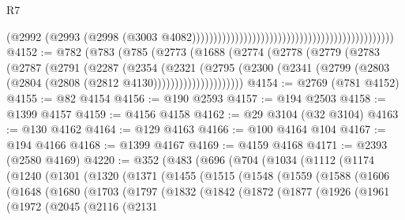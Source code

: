 \begin{lexlean}{R7}
\begin{coremodule}
                                                                                          (@2992
                                                                                            (@2993
                                                                                              (@2998
                                                                                                (@3003
                                                                                                  @4082)))))))))))))))))))))))))))))))))))))))))))))))
@4152 := @782
    (@783
      (@785
        (@2773
          (@1688
            (@2774
              (@2778
                (@2779
                  (@2783
                    (@2787
                      (@2791
                        (@2287
                          (@2354
                            (@2321
                              (@2795
                                (@2300
                                  (@2341
                                    (@2799 (@2803 (@2804 (@2808 (@2812 @4130)))))))))))))))))))))
@4154 := @2769 (@781 @4152)
@4155 := @82 @4154
@4156 := @190 @2593
@4157 := @194 @2503
@4158 := @1399 @4157
@4159 := @4156 @4158
@4162 := @29 @3104 (@32 @3104)
@4163 := @130 @4162
@4164 := @129 @4163
@4166 := @100 @4164 @104
@4167 := @194 @4166
@4168 := @1399 @4167
@4169 := @4159 @4168
@4171 := @2393 (@2580 @4169)
@4220 := @352
    (@483
      (@696
        (@704
          (@1034
            (@1112
              (@1174
                (@1240
                  (@1301
                    (@1320
                      (@1371
                        (@1455
                          (@1515
                            (@1548
                              (@1559
                                (@1588
                                  (@1606
                                    (@1648
                                      (@1680
                                        (@1703
                                          (@1797
                                            (@1832
                                              (@1842
                                                (@1872
                                                  (@1877
                                                    (@1926
                                                      (@1961
                                                        (@1972
                                                          (@2045
                                                            (@2116
                                                              (@2131

\end{coremodule}
\end{lexlean}
